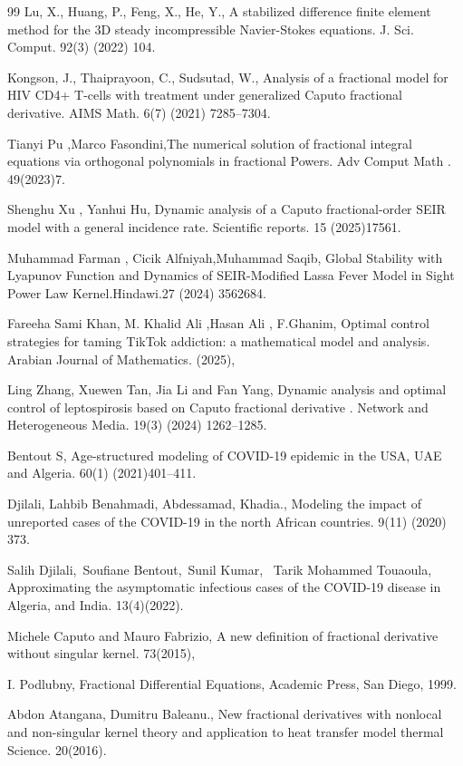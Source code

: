 \documentclass[10pt]{NSP1}
\begin{document}
\begin{thebibliography}{99}
Lu, X., Huang, P., Feng, X., He, Y., A stabilized difference finite element method for the 3D steady incompressible Navier-Stokes equations. J. Sci. Comput. 92(3) (2022) 104.

Kongson, J., Thaiprayoon, C., Sudsutad, W., Analysis of a fractional model for HIV CD4+ T-cells with treatment under generalized Caputo fractional derivative. AIMS Math. 6(7) (2021) 7285–7304.

Tianyi Pu ,Marco Fasondini,The numerical solution of fractional integral equations via orthogonal polynomials in fractional Powers. Adv Comput Math . 49(2023)7.

Shenghu Xu , Yanhui Hu, Dynamic analysis of a Caputo fractional-order SEIR model with a general incidence rate. Scientific reports. 15 (2025)17561.

Muhammad Farman , Cicik Alfniyah,Muhammad Saqib, Global Stability with Lyapunov Function and Dynamics of SEIR-Modified Lassa Fever Model in Sight Power Law Kernel.Hindawi.27 (2024) 3562684.

Fareeha Sami Khan, M. Khalid Ali ,Hasan Ali , F.Ghanim, Optimal control strategies for taming TikTok addiction: a mathematical model and analysis. Arabian Journal of Mathematics. (2025),

Ling Zhang, Xuewen Tan, Jia Li and Fan Yang, Dynamic analysis and optimal control of leptospirosis based on Caputo fractional derivative . Network and Heterogeneous Media. 19(3) (2024) 1262–1285.

Bentout S, Age-structured modeling of COVID-19 epidemic in the USA, UAE and Algeria. 60(1) (2021)401–411.

Djilali, Lahbib Benahmadi, Abdessamad, Khadia., Modeling the impact of unreported cases of the COVID-19 in the north African countries. 9(11) (2020) 373.

Salih Djilali, Soufiane Bentout, Sunil Kumar,  Tarik Mohammed Touaoula, Approximating the asymptomatic infectious cases of the COVID-19 disease in Algeria, and India. 13(4)(2022).

Michele Caputo and Mauro Fabrizio, A new deﬁnition of fractional derivative without singular kernel. 73(2015),

I. Podlubny, Fractional Diﬀerential Equations, Academic Press, San Diego, 1999.

Abdon Atangana, Dumitru Baleanu., New fractional derivatives with nonlocal and non-singular kernel theory and application to heat transfer model thermal Science. 20(2016).


\end{thebibliography}
\end{document}
